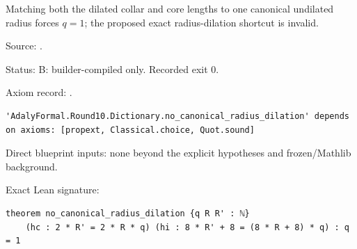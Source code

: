 \begin{theorem}[bp-137]
\label{bp-137}
\uses{}
\leanok
Matching both the dilated collar and core lengths to one canonical undilated radius forces \(q=1\); the proposed exact radius-dilation shortcut is invalid.

\par Source: \texttt{}.
\par Status: B: builder-compiled only. Recorded exit 0.
\par Axiom record: \texttt{}.
\begin{verbatim}
'AdalyFormal.Round10.Dictionary.no_canonical_radius_dilation' depends on axioms: [propext, Classical.choice, Quot.sound]
\end{verbatim}
\par Direct blueprint inputs: none beyond the explicit hypotheses and frozen/Mathlib background.
\par Exact Lean signature:
\begin{verbatim}
theorem no_canonical_radius_dilation {q R R' : ℕ}
    (hc : 2 * R' = 2 * R * q) (hi : 8 * R' + 8 = (8 * R + 8) * q) : q = 1
\end{verbatim}
\end{theorem}

